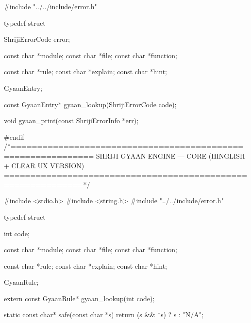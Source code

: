 \documentclass{article}
\begin{document}
#include "../../include/error.h"

typedef struct {

    ShrijiErrorCode error;

    const char *module;
    const char *file;
    const char *function;

    const char *rule;
    const char *explain;
    const char *hint;

} GyaanEntry;

const GyaanEntry* gyaan_lookup(ShrijiErrorCode code);

void gyaan_print(const ShrijiErrorInfo *err);

#endif
/*=============================================================
  SHRIJI GYAAN ENGINE — CORE (HINGLISH + CLEAR UX VERSION)
=============================================================*/

#include <stdio.h>
#include <string.h>
#include "../../include/error.h"

typedef struct {
    int code;

    const char *module;
    const char *file;
    const char *function;

    const char *rule;
    const char *explain;
    const char *hint;

} GyaanRule;

extern const GyaanRule* gyaan_lookup(int code);

static const char* safe(const char *s)
{
    return (s && *s) ? s : "N/A";
}
\end{document}
